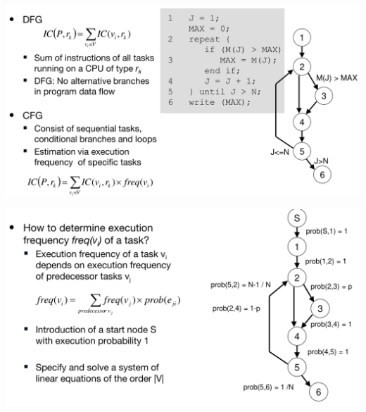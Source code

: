 \documentclass[english]{latex4ei/latex4ei_sheet}
\begin{document}
\begin{center}
  \includegraphics[width=\linewidth]{assets/InstructionCountEstDFG.png}
  \label{fig:instructioncountestdfg}
\end{center}


\begin{center}
  \includegraphics[width=\linewidth]{assets/ICECFG.png}
  \label{fig:icecfg}
\end{center}

\end{document}
